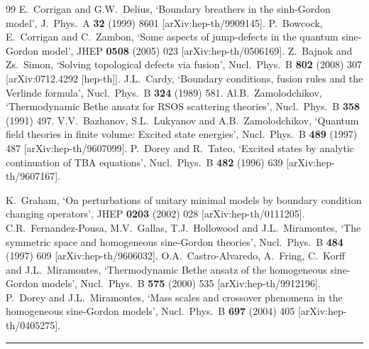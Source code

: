 \documentclass[11pt]{article}
\begin{document}
\begin{thebibliography}{99}
%
  E.~Corrigan and G.W.~Delius,
  `Boundary breathers in the sinh-Gordon model',
  J.\ Phys.\ A  {\bf 32} (1999) 8601
  [arXiv:hep-th/9909145].
%
  P.~Bowcock, E.~Corrigan and C.~Zambon,
  `Some aspects of jump-defects in the quantum sine-Gordon model',
  JHEP {\bf 0508} (2005) 023
  [arXiv:hep-th/0506169].
%
  Z.~Bajnok and Zs.~Simon,
  `Solving topological defects via fusion',
  Nucl.\ Phys.\  B {\bf 802} (2008) 307
  [arXiv:0712.4292 [hep-th]].
%
  J.L.~Cardy,
  `Boundary conditions, fusion rules and the Verlinde formula',
  Nucl.\ Phys.\  B {\bf 324} (1989) 581.
%
  Al.B.~Zamolodchikov,
  `Thermodynamic Bethe ansatz for RSOS scattering theories',
  Nucl.\ Phys.\  B {\bf 358} (1991) 497.
%
  V.V.~Bazhanov, S.L.~Lukyanov and A.B.~Zamolodchikov,
  `Quantum field theories in finite volume: Excited state
  energies',
  Nucl.\ Phys.\  B {\bf 489} (1997) 487
  [arXiv:hep-th/9607099].
%
  P.~Dorey and R.~Tateo,
  `Excited states by analytic continuation of TBA equations',
  Nucl.\ Phys.\  B {\bf 482} (1996) 639
  [arXiv:hep-th/9607167].
%

  K.~Graham,
  `On perturbations of unitary minimal models by boundary condition
  changing operators',
  JHEP {\bf 0203} (2002) 028
  [arXiv:hep-th/0111205].
%
  C.R.~Fernandez-Pousa, M.V.~Gallas, T.J.~Hollowood and
J.L.~Miramontes,
  `The symmetric space and homogeneous sine-Gordon theories',
  Nucl.\ Phys.\  B {\bf 484} (1997) 609
  [arXiv:hep-th/9606032].
%
  O.A.~Castro-Alvaredo, A.~Fring, C.~Korff and J.L.~Miramontes,
  `Thermodynamic Bethe ansatz of the homogeneous sine-Gordon
  models',
  Nucl.\ Phys.\  B {\bf 575} (2000) 535
  [arXiv:hep-th/9912196].
%
  P.~Dorey and J.L.~Miramontes,
  `Mass scales and crossover phenomena in the homogeneous
  sine-Gordon models',
  Nucl.\ Phys.\  B {\bf 697} (2004) 405
  [arXiv:hep-th/0405275].
%
\end{thebibliography}

\bigskip
\bigskip

\hrule

\bigskip
\end{document}
